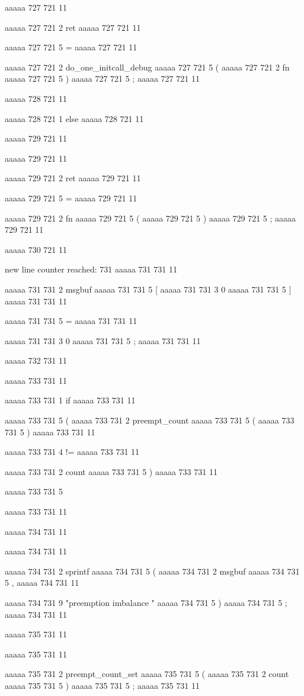 {aaaaa 727 721
11
	
aaaaa 727 721
2
ret
aaaaa 727 721
11
 
aaaaa 727 721
5
=
aaaaa 727 721
11
 
aaaaa 727 721
2
do_one_initcall_debug
aaaaa 727 721
5
(
aaaaa 727 721
2
fn
aaaaa 727 721
5
)
aaaaa 727 721
5
;
aaaaa 727 721
11


aaaaa 728 721
11
	
aaaaa 728 721
1
else
aaaaa 728 721
11


aaaaa 729 721
11
	
aaaaa 729 721
11
	
aaaaa 729 721
2
ret
aaaaa 729 721
11
 
aaaaa 729 721
5
=
aaaaa 729 721
11
 
aaaaa 729 721
2
fn
aaaaa 729 721
5
(
aaaaa 729 721
5
)
aaaaa 729 721
5
;
aaaaa 729 721
11


aaaaa 730 721
11


new line counter reached: 731
aaaaa 731 731
11
	
aaaaa 731 731
2
msgbuf
aaaaa 731 731
5
[
aaaaa 731 731
3
0
aaaaa 731 731
5
]
aaaaa 731 731
11
 
aaaaa 731 731
5
=
aaaaa 731 731
11
 
aaaaa 731 731
3
0
aaaaa 731 731
5
;
aaaaa 731 731
11


aaaaa 732 731
11


aaaaa 733 731
11
	
aaaaa 733 731
1
if
aaaaa 733 731
11
 
aaaaa 733 731
5
(
aaaaa 733 731
2
preempt_count
aaaaa 733 731
5
(
aaaaa 733 731
5
)
aaaaa 733 731
11
 
aaaaa 733 731
4
!=
aaaaa 733 731
11
 
aaaaa 733 731
2
count
aaaaa 733 731
5
)
aaaaa 733 731
11
 
aaaaa 733 731
5
{
aaaaa 733 731
11


aaaaa 734 731
11
	
aaaaa 734 731
11
	
aaaaa 734 731
2
sprintf
aaaaa 734 731
5
(
aaaaa 734 731
2
msgbuf
aaaaa 734 731
5
,
aaaaa 734 731
11
 
aaaaa 734 731
9
"preemption imbalance "
aaaaa 734 731
5
)
aaaaa 734 731
5
;
aaaaa 734 731
11


aaaaa 735 731
11
	
aaaaa 735 731
11
	
aaaaa 735 731
2
preempt_count_set
aaaaa 735 731
5
(
aaaaa 735 731
2
count
aaaaa 735 731
5
)
aaaaa 735 731
5
;
aaaaa 735 731
11


}}
